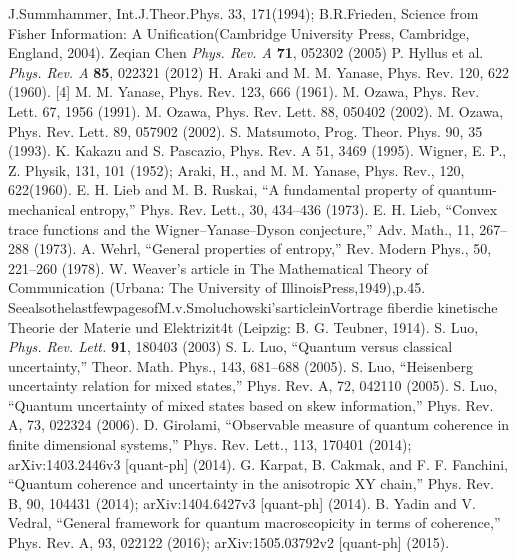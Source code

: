 \begin{thebibliography}{}
  J.Summhammer, Int.J.Theor.Phys. 33, 171(1994);
  B.R.Frieden, Science from Fisher Information: A Unification(Cambridge University Press, Cambridge, England, 2004).
  Zeqian Chen \textit{Phys. Rev. A} \textbf{71}, 052302 (2005)
  P. Hyllus et al. \textit{Phys. Rev. A} \textbf{85}, 022321 (2012)
  H. Araki and M. M. Yanase, Phys. Rev. 120, 622 (1960). [4] M. M. Yanase, Phys. Rev. 123, 666 (1961).
  M. Ozawa, Phys. Rev. Lett. 67, 1956 (1991).
  M. Ozawa, Phys. Rev. Lett. 88, 050402 (2002).
  M. Ozawa, Phys. Rev. Lett. 89, 057902 (2002).
  S. Matsumoto, Prog. Theor. Phys. 90, 35 (1993).
  K. Kakazu and S. Pascazio, Phys. Rev. A 51, 3469 (1995).
  Wigner, E. P., Z. Physik, 131, 101 (1952); Araki, H., and M. M. Yanase, Phys. Rev., 120, 622(1960).
  E. H. Lieb and M. B. Ruskai, “A fundamental property of quantum-mechanical entropy,” Phys. Rev. Lett., 30, 434–436 (1973).
  E. H. Lieb, “Convex trace functions and the Wigner–Yanase–Dyson conjecture,” Adv. Math., 11, 267–288 (1973).
  A. Wehrl, “General properties of entropy,” Rev. Modern Phys., 50, 221–260 (1978).
  W. Weaver's article in The Mathematical Theory of Communication (Urbana: The University of IllinoisPress,1949),p.45. SeealsothelastfewpagesofM.v.Smoluchowski'sarticleinVortrage fiberdie kinetische Theorie der Materie und Elektrizit4t (Leipzig: B. G. Teubner, 1914).
  S. Luo, \textit{Phys. Rev. Lett.} \textbf{91}, 180403 (2003)
  S. L. Luo, “Quantum versus classical uncertainty,” Theor. Math. Phys., 143, 681–688 (2005).
  S. Luo, “Heisenberg uncertainty relation for mixed states,” Phys. Rev. A, 72, 042110 (2005).
  S. Luo, “Quantum uncertainty of mixed states based on skew information,” Phys. Rev. A, 73, 022324 (2006).
  D. Girolami, “Observable measure of quantum coherence in finite dimensional systems,” Phys. Rev. Lett., 113, 170401 (2014); arXiv:1403.2446v3 [quant-ph] (2014).
  G. Karpat, B. Cakmak, and F. F. Fanchini, “Quantum coherence and uncertainty in the anisotropic XY chain,” Phys. Rev. B, 90, 104431 (2014); arXiv:1404.6427v3 [quant-ph] (2014).
  B. Yadin and V. Vedral, “General framework for quantum macroscopicity in terms of coherence,” Phys. Rev. A, 93, 022122 (2016); arXiv:1505.03792v2 [quant-ph] (2015).

\end{thebibliography}
